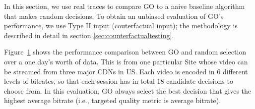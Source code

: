 \begin{figure}[t!]
\centering
{}
\label{fig:counterfactual}
\end{figure}



In this section, we use real traces to compare GO to a naive baseline algorithm that makes random decisions.  To obtain an unbiased evaluation of GO's performance, we use Type II input (couterfactual input); the methodology is described in detail in section \ref{sec:counterfactualtesting}. 

Figure~\ref{fig:counterfactual} shows the performance comparison between GO and random selection over a one day's worth of data. This is from one particular Site whose video can be streamed from three major CDNs in US. Each video is encoded in 6 different levels of bitrates, so that each session has in total 18 candidate decisions to choose from. In this evaluation, GO always select the best decision that gives the highest average bitrate (i.e., targeted quality metric is average bitrate).

